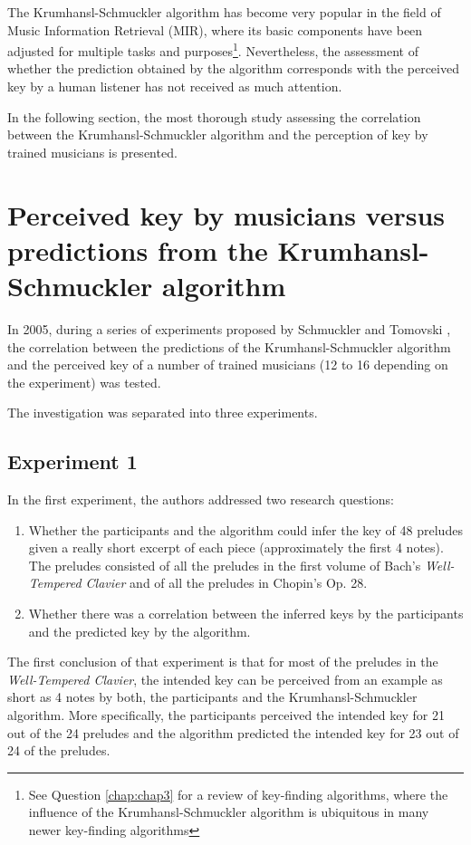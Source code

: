 The Krumhansl-Schmuckler algorithm has become very popular in the field of Music Information Retrieval (MIR), where its basic components have been adjusted for multiple tasks and purposes\footnote{See Question \ref{chap:chap3} for a review of key-finding algorithms, where the influence of the Krumhansl-Schmuckler algorithm is ubiquitous in many newer key-finding algorithms}. Nevertheless, the assessment of whether the prediction obtained by the algorithm corresponds with the perceived key by a human listener has not received as much attention. 

In the following section, the most thorough study assessing the correlation between the Krumhansl-Schmuckler algorithm and the perception of key by trained musicians is presented.

\section{Perceived key by musicians versus predictions from the Krumhansl-Schmuckler algorithm}

In 2005, during a series of experiments proposed by Schmuckler and Tomovski \cite{schmuckler_perceptual_2005}, the correlation between the predictions of the Krumhansl-Schmuckler algorithm and the perceived key of a number of trained musicians (12 to 16 depending on the experiment) was tested.

The investigation was separated into three experiments.

\subsection{Experiment 1}

In the first experiment, the authors addressed two research questions: 
\begin{enumerate}
    \item Whether the participants and the algorithm could infer the key of 48 preludes given a really short excerpt of each piece (approximately the first 4 notes). The preludes consisted of all the preludes in the first volume of Bach's \emph{Well-Tempered Clavier} and of all the preludes in Chopin's Op. 28.
    \item Whether there was a correlation between the inferred keys by the participants and the predicted key by the algorithm.
\end{enumerate} 

The first conclusion of that experiment is that for most of the preludes in the \emph{Well-Tempered Clavier}, the intended key can be perceived from an example as short as 4 notes by both, the participants and the Krumhansl-Schmuckler algorithm. More specifically, the participants perceived the intended key for 21 out of the 24 preludes and the algorithm predicted the intended key for 23 out of 24 of the preludes.

